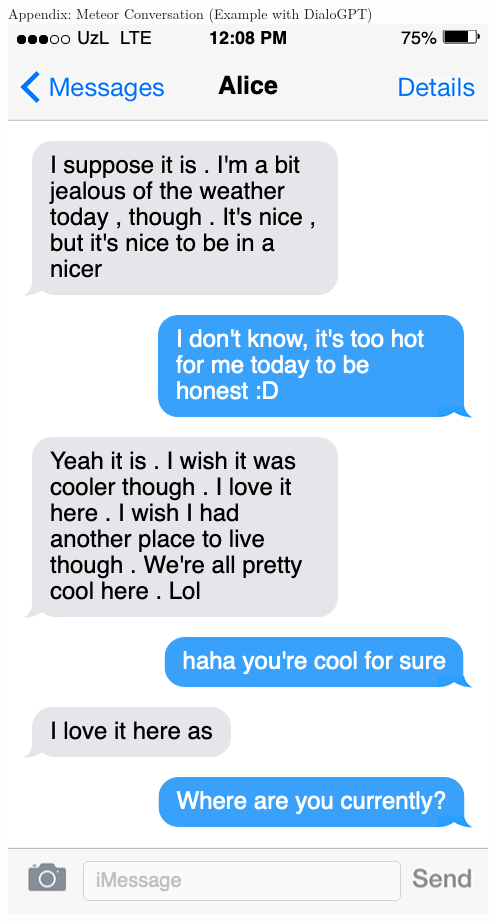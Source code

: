 \documentclass[10pt]{beamer}
\begin{document}
\begin{frame}{Appendix: Meteor Conversation (Example with DialoGPT)}
	\centering
	\includegraphics[height=0.9\textheight]{twoway_dialogpt.png}
\end{frame}
\end{document}
